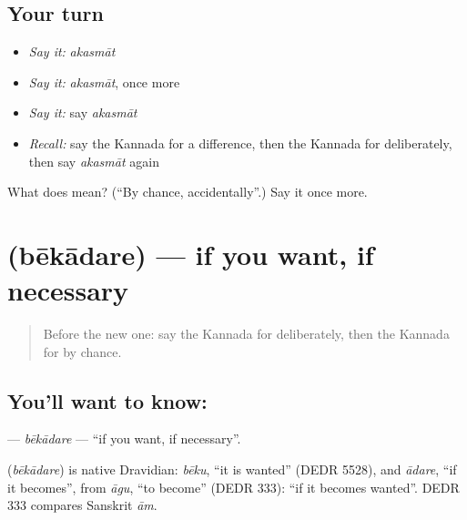 \subsection*{Your turn}
\begin{itemize}
\raggedright
  \item \emph{Say it:} \emph{akasmāt}
  \item \emph{Say it:} \emph{akasmāt}, once more
  \item \emph{Say it:} say \emph{akasmāt}
  \item \emph{Recall:} say the Kannada for a difference, then the Kannada for deliberately, then say \emph{akasmāt} again
\end{itemize}

\begin{tcolorbox}[breakable,colback=teal!4,colframe=teal!35!black,title={Before you move on}]
What does  mean? (\textquotedblleft{}By chance, accidentally\textquotedblright{}.) Say it once more.
\end{tcolorbox}
\section[\texorpdfstring{\kn{ಬೇಕಾದರೆ} (bēkādare)}{ಬೇಕಾದರೆ (bēkādare)}]{ (bēkādare) — if you want, if necessary}

\label{lesson:KA-C178-bekadare}



\begin{quote}
Before the new one: say the Kannada for deliberately, then the Kannada for by chance.
\end{quote}

\subsection*{You'll want to know: }
\textbf{} — \emph{bēkādare} — \textquotedblleft{}if you want, if necessary\textquotedblright{}.

\begin{cousinweb}
\textbf{} (\emph{bēkādare}) is native Dravidian: \emph{bēku}, \textquotedblleft{}it is wanted\textquotedblright{} (DEDR 5528), and \emph{ādare}, \textquotedblleft{}if it becomes\textquotedblright{}, from \emph{āgu}, \textquotedblleft{}to become\textquotedblright{} (DEDR 333): \textquotedblleft{}if it becomes wanted\textquotedblright{}. DEDR 333 compares Sanskrit \emph{ām}.
\end{cousinweb}

